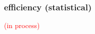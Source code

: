 \begin{comment}
	time needed for each judgement based on method from (Coertjens_et_al_2017).
	
	statistical efficiency has been researched on \citet{Leijon_et_al_2019} and \citet{Pritikin_2020} for the bayesian dichotomous BTL model and the ordinal BTL model, respectively.
\end{comment}
%
%
\subsubsection{efficiency (statistical)}
%
\textcolor{red}{(in process)}